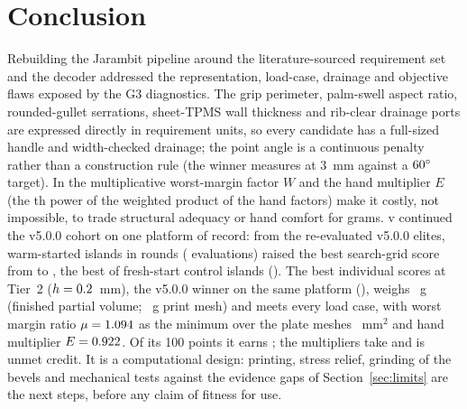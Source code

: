\section{Conclusion}\label{sec:conclusion}
Rebuilding the Jarambit pipeline around the literature-sourced requirement set  and the 
decoder addressed the representation, load-case, drainage and objective flaws exposed by the G3 diagnostics. The grip
perimeter, palm-swell aspect ratio, rounded-gullet serrations, sheet-TPMS wall thickness and rib-clear drainage ports are
expressed directly in requirement units, so every candidate has a full-sized handle and width-checked drainage; the point
angle is a continuous penalty rather than a construction rule (the winner measures \gPointAngleThree\textdegree{} at
3~mm against a $60^\circ$ target). In  the multiplicative worst-margin factor $W$ and the
hand multiplier $E$ (the \gEExp th power of the weighted product of the hand factors) make it costly, not impossible, to trade
structural adequacy or hand comfort for grams. v\gRecord{} continued the v5.0.0 cohort on one platform of record: from the
re-evaluated v5.0.0 elites, \gIslands{} warm-started islands in \gRounds{} rounds (\gEvalsTotal{} evaluations) raised the best
search-grid score from \gPoolZeroBest{} to \gPoolFinalBest, \gLineageVsControl{} the best of \gControlIslands{} fresh-start control
islands (\gControlBest). The best individual \gDesign{} scores \gScore{} at Tier~2 ($h = 0.2$~mm), \gVsVFiveScore{} the
v5.0.0 winner on the same platform (\gVFiveScore), weighs \gMassFinishedG{}~g (finished partial volume; \gMassG{}~g print mesh)
and meets every load case, with worst margin ratio $\mu = 1.094$ as the minimum over the plate meshes
\gPlateCheckMeshes~mm$^2$ and hand multiplier $E = 0.922$. Of its 100 points it earns \gBudgetEarned; the multipliers take
\gBudgetLost{} and \gBudgetUnmet{} is unmet credit. It is a computational design: printing, stress relief, grinding of the bevels
and mechanical tests against the evidence gaps of Section~\ref{sec:limits} are the next steps, before any claim of fitness for use.
